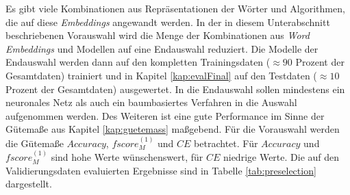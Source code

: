 \documentclass[a4paper,11pt]{article}
\begin{document}
Es gibt viele Kombinationen aus Repräsentationen der Wörter und Algorithmen, die auf diese \textit{Embeddings} angewandt werden. In der in diesem Unterabschnitt beschriebenen Vorauswahl wird die Menge der Kombinationen aus \textit{Word Embeddings} und Modellen auf eine Endauswahl reduziert. Die Modelle der Endauswahl werden dann auf den kompletten Trainingsdaten ($\approx 90$ Prozent der Gesamtdaten) trainiert und in Kapitel \ref{kap:evalFinal} auf den Testdaten ($\approx 10$ Prozent der Gesamtdaten) ausgewertet. In die Endauswahl sollen mindestens ein neuronales Netz als auch ein baumbasiertes Verfahren in die Auswahl aufgenommen werden. Des Weiteren ist eine gute Performance im Sinne der Gütemaße aus Kapitel \ref{kap:guetemass} maßgebend. Für die Vorauswahl werden die Gütemaße $Accuracy$, $fscore_M^{(1)}$ und $CE$ betrachtet. Für $Accuracy$ und $fscore_M^{(1)}$ sind hohe Werte wünschenswert, für $CE$ niedrige Werte.
Die auf den Validierungsdaten evaluierten Ergebnisse sind in Tabelle \ref{tab:preselection} dargestellt.\\
\end{document}

